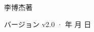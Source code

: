 \begin{titlepage}
\vfill
{\LARGE\sffamily 李博杰\quad 著\par}
\vspace{0.7cm}
{\small\sffamily\color{structurecolor!80} バージョン v2.0 · \number\year 年 \number\month 月 \number\day 日\par}
\vspace{1.2cm}
\end{titlepage}
